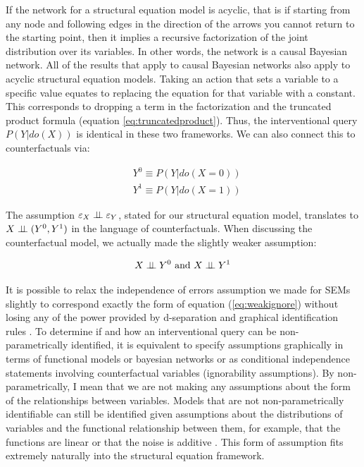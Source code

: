 \documentclass[11pt,a4paper,oneside]{book}
\let\epsilon\varepsilon
\begin{document}
If the network for a structural equation model is acyclic, that is if starting from any node and following edges in the direction of the arrows you cannot return to the starting point, then it implies a recursive factorization of the joint distribution over its variables. In other words, the network is a causal Bayesian network. All of the results that apply to causal Bayesian networks also apply to acyclic structural equation models.  Taking an action that sets a variable to a specific value equates to replacing the equation for that variable with a constant. This corresponds to dropping a term in the factorization and the truncated product formula (equation \ref{eq:truncatedproduct}). Thus, the interventional query $P(Y|do(X))$ is identical in these two frameworks. We can also connect this to counterfactuals via:

\begin{equation}
\begin{aligned}
&Y^{0} \equiv P(Y|do(X=0)) \\
&Y^{1} \equiv P(Y|do(X=1))
\end{aligned}
\end{equation}

The assumption $\epsilon_{X} \ci \epsilon_{Y}$, stated for our structural equation model, translates to $X \perp\!\!\!\perp (Y^{0},Y^{1})$ in the language of counterfactuals. When discussing the counterfactual model, we actually made the slightly weaker assumption:

\begin{equation}
\label{eq:weakignore}
X \perp\!\!\!\perp Y^{0} \text{ and } X \perp\!\!\!\perp Y^{1}
\end{equation}

It is possible to relax the independence of errors assumption we made for SEMs slightly to correspond exactly the form of equation (\ref{eq:weakignore}) without losing any of the power provided by d-separation and graphical identification rules \cite{Richardson2013}. To determine if and how an interventional query can be non-parametrically identified, it is equivalent to specify assumptions graphically in terms of functional models or bayesian networks or as conditional independence statements involving counterfactual variables (ignorability assumptions). By non-parametrically, I mean that we are not making any assumptions about the form of the relationships between variables. Models that are not non-parametrically identifiable can still be identified given assumptions about the distributions of variables and the functional relationship between them, for example, that the functions are linear or that the noise is additive \cite{Peters2014}. This form of assumption fits extremely naturally into the structural equation framework. 
\end{document}
